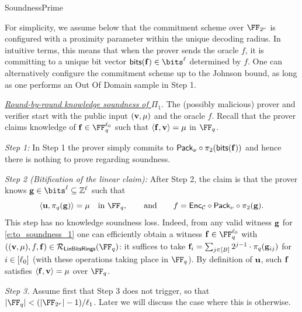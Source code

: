 \begin{lncsmove}{SoundnessPrime}
\begin{remark}\label{r:oracle_udr}For simplicity, we assume below that the commitment scheme over $\comfield$ is configured with a proximity parameter within the unique decoding radius. In intuitive terms, this means that when the prover sends the oracle $f$, it is committing to a unique bit vector $\bitstext(\bff) \in \bits^{\codedim}$ determined by $f$.  One can alternatively configure the commitment scheme up to the Johnson bound, as long as one performs an Out Of Domain sample in Step 1. 
\end{remark}


\medskip

\noindent \emph{\underline{Round-by-round knowledge soundness of $\Pi_1$}}. The (possibly malicious) prover and verifier start with the public input $(\mathbf{v},\mu)$ and the oracle $f$.  Recall that the prover claims knowledge of $\bff\in \FF_q^{\codedim_0}$ such that $\langle \mathbf{f},\mathbf{v}\rangle=\mu$ in $\FF_q$.  

 \emph{Step 1:} In Step 1 the prover simply commits to $\mathsf{Pack}_\nu\circ\pi_2(\mathsf{bits}(\mathbf{f}))$ and hence there is nothing to prove regarding soundness.
 
   \emph{Step 2 (Bitification of the linear claim):} After Step 2, the claim is  that the prover knows $\bfg\in \bits^{\codedim}\subseteq \ZZ^\codedim$ such that
%
\begin{equation}\label{e:to_soundness_1}
\langle \uu, \pi_q(\bfg)\rangle = \mu \quad \text{in } \FF_q, \qquad \text{and} \qquad f= \Enc_\cC \circ \pack\circ \pi_2(\bfg).
\end{equation}
%
This step has no  knowledge soundness loss. Indeed, from any valid witness $\mathbf{g}$ for \eqref{e:to_soundness_1} one can efficiently obtain a witness $\bff\in \FF_q^{\codedim_0}$ with $((\vv,\mu), f, \bff)\in \LinBitsDual(\FF_q)$: it suffices to take $\mathbf{f}_i=\sum_{j\in [B]} 2^{j-1}\cdot \pi_q(\mathbf{g}_{ij})$ for $i\in [\ell_0]$ (with these operations taking place in $\FF_q$). By definition of $\mathbf{u}$, such $\mathbf{f}$ satisfies $\langle \mathbf{f},\mathbf{v}\rangle=\mu$ over $\FF_q$.

\emph{Step 3.} Assume first that Step 3 does not trigger, so that $|\FF_q|<(|\comfield|-1)/\codedim_1$. Later we will discuss the case where this is otherwise.


\end{lncsmove}
